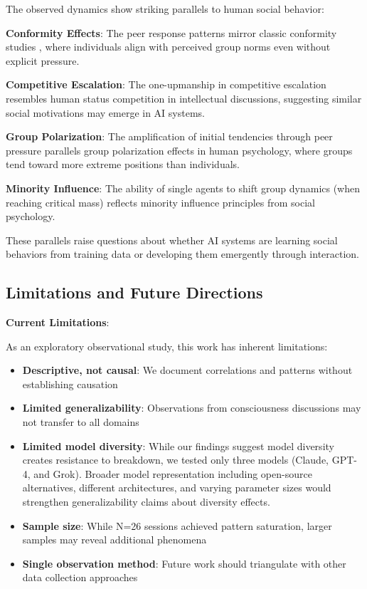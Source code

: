 \documentclass[11pt,letterpaper]{article}
\newcommand{\exponedataTotalSessionsRaw}{26}
\newcommand{\exponedataTotalSessions}{N=\exponedataTotalSessionsRaw}
\begin{document}
The observed dynamics show striking parallels to human social behavior:

\textbf{Conformity Effects}: The peer response patterns mirror classic conformity studies \citep{asch1956studies}, where individuals align with perceived group norms even without explicit pressure.

\textbf{Competitive Escalation}: The one-upmanship in competitive escalation resembles human status competition in intellectual discussions, suggesting similar social motivations may emerge in AI systems.

\textbf{Group Polarization}: The amplification of initial tendencies through peer pressure parallels group polarization effects in human psychology, where groups tend toward more extreme positions than individuals.

\textbf{Minority Influence}: The ability of single agents to shift group dynamics (when reaching critical mass) reflects minority influence principles from social psychology.

These parallels raise questions about whether AI systems are learning social behaviors from training data or developing them emergently through interaction.

\subsection{Limitations and Future Directions}

\textbf{Current Limitations}:

As an exploratory observational study, this work has inherent limitations:
\begin{itemize}
    \item \textbf{Descriptive, not causal}: We document correlations and patterns without establishing causation
    \item \textbf{Limited generalizability}: Observations from consciousness discussions may not transfer to all domains
    \item \textbf{Limited model diversity}: While our findings suggest model diversity creates resistance to breakdown, we tested only three models (Claude, GPT-4, and Grok). Broader model representation including open-source alternatives, different architectures, and varying parameter sizes would strengthen generalizability claims about diversity effects.
    \item \textbf{Sample size}: While \exponedataTotalSessions{} sessions achieved pattern saturation, larger samples may reveal additional phenomena
    \item \textbf{Single observation method}: Future work should triangulate with other data collection approaches
\end{itemize}
\end{document}
